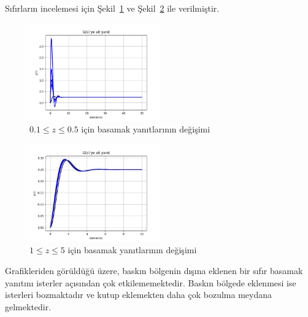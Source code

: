 Sıfırların incelemesi için Şekil~\ref{fig:plot3} ve Şekil~\ref{fig:plot4} ile verilmiştir. 

\begin{figure}[!htb]
    \centering
    \includegraphics[width=0.5\textwidth]{plot3}
    \caption{$0.1\leq z\leq 0.5$ için basamak yanıtlarının değişimi}\label{fig:plot3}
\end{figure}

\begin{figure}[!htb]
    \centering
    \includegraphics[width=0.5\textwidth]{plot4}
    \caption{$1\leq z\leq 5$ için basamak yanıtlarının değişimi}\label{fig:plot4}
\end{figure}

Grafikleriden görüldüğü üzere, baskın bölgenin dışına eklenen bir sıfır basamak yanıtını isterler açısından çok etkilememektedir. Baskın bölgede eklenmesi ise isterleri bozmaktadır ve kutup eklemekten daha çok bozulma meydana gelmektedir.